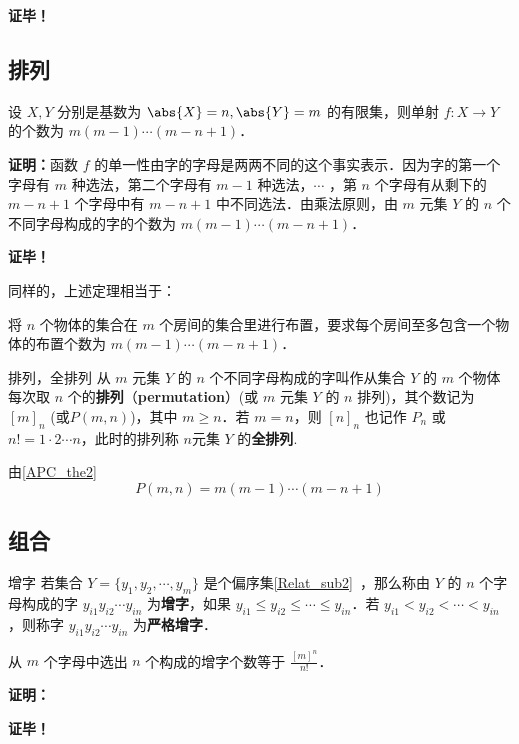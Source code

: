 \textbf{证毕！}
\subsection{排列}
\begin{theorem}{}
设 $X,Y$ 分别是基数为 $\abs{X}=n,\abs{Y}=m$ 的有限集，则单射 $f:X\rightarrow Y$ 的个数为 $m(m-1)\cdots(m-n+1)$．
\end{theorem}
\textbf{证明：}函数 $f$ 的单一性由字的字母是两两不同的这个事实表示．因为字的第一个字母有 $m$ 种选法，第二个字母有 $m-1$ 种选法，$\cdots$ ，第 $n$ 个字母有从剩下的 $m-n+1$ 个字母中有 $m-n+1$ 中不同选法．由乘法原则，由 $m$ 元集 $Y$ 的 $n$ 个不同字母构成的字的个数为 $m(m-1)\cdots(m-n+1)$．

\textbf{证毕！}

同样的，上述定理相当于：
\begin{theorem}{}\label{APC_the2}
将 $n$ 个物体的集合在 $m$ 个房间的集合里进行布置，要求每个房间至多包含一个物体的布置个数为 $m(m-1)\cdots(m-n+1)$．
\end{theorem}

\begin{definition}{排列，全排列}
从 $m$ 元集 $Y$ 的 $n$ 个不同字母构成的字叫作从集合 $Y$ 的 $m$ 个物体每次取 $n$ 个的\textbf{排列}（\textbf{permutation}）(或 $m$ 元集 $Y$ 的 $n$ 排列)，其个数记为 $[m]_n$ (或$P(m,n)$)，其中 $m\geq n$．若 $m=n$，则 $[n]_n$ 也记作 $P_n$ 或 $n!=1\cdot2\cdots n$，此时的排列称 $n$元集 $Y$ 的\textbf{全排列}.
\end{definition}
由\autoref{APC_the2} 
\begin{equation}
P(m,n)=m(m-1)\cdots(m-n+1)
\end{equation}

\subsection{组合}

\begin{definition}{增字}
若集合 $Y=\{y_1,y_2,\cdots,y_m\}$ 是个偏序集\autoref{Relat_sub2}~，那么称由 $Y$ 的 $n$ 个字母构成的字 $y_{i1}y_{i2}\cdots y_{in}$ 为\textbf{增字}，如果 $y_{i1}\leq y_{i2}\leq\cdots\leq y_{in}$．若 $y_{i1}<y_{i2}<\cdots<y_{in}$，则称字 $y_{i1}y_{i2}\cdots y_{in}$ 为\textbf{严格增字}．
\end{definition}
\begin{theorem}{}
从 $m$ 个字母中选出 $n$ 个构成的增字个数等于 $\frac{[m]^n}{n!}$．
\end{theorem}
\textbf{证明：}

\textbf{证毕！}